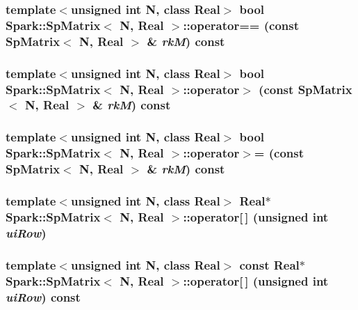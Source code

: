 \subsubsection{\setlength{\rightskip}{0pt plus 5cm}template$<$unsigned int N, class Real$>$ bool {\bf Spark::Sp\-Matrix}$<$ N, Real $>$::operator== (const {\bf Sp\-Matrix}$<$ N, Real $>$ \& {\em rk\-M}) const}\label{classSpark_1_1SpMatrix_a14}


\subsubsection{\setlength{\rightskip}{0pt plus 5cm}template$<$unsigned int N, class Real$>$ bool {\bf Spark::Sp\-Matrix}$<$ N, Real $>$::operator$>$ (const {\bf Sp\-Matrix}$<$ N, Real $>$ \& {\em rk\-M}) const}\label{classSpark_1_1SpMatrix_a18}


\subsubsection{\setlength{\rightskip}{0pt plus 5cm}template$<$unsigned int N, class Real$>$ bool {\bf Spark::Sp\-Matrix}$<$ N, Real $>$::operator$>$= (const {\bf Sp\-Matrix}$<$ N, Real $>$ \& {\em rk\-M}) const}\label{classSpark_1_1SpMatrix_a19}


\subsubsection{\setlength{\rightskip}{0pt plus 5cm}template$<$unsigned int N, class Real$>$ Real$\ast$ {\bf Spark::Sp\-Matrix}$<$ N, Real $>$::operator[$\,$] (unsigned int {\em ui\-Row})}\label{classSpark_1_1SpMatrix_a6}


\subsubsection{\setlength{\rightskip}{0pt plus 5cm}template$<$unsigned int N, class Real$>$ const Real$\ast$ {\bf Spark::Sp\-Matrix}$<$ N, Real $>$::operator[$\,$] (unsigned int {\em ui\-Row}) const}\label{classSpark_1_1SpMatrix_a5}


